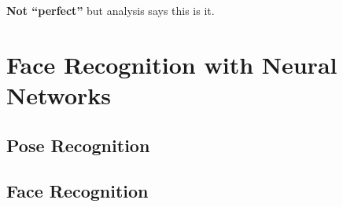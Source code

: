 \documentclass[12pt,a4paper]{article}
\begin{document}
\begin{enumerate}[a)]
\textbf{Not ``perfect''} but analysis says this is it.

\end{enumerate}

\section{Face Recognition with Neural Networks}

\subsection{Pose Recognition}

\subsection{Face Recognition}

\printbibliography
\end{document}
